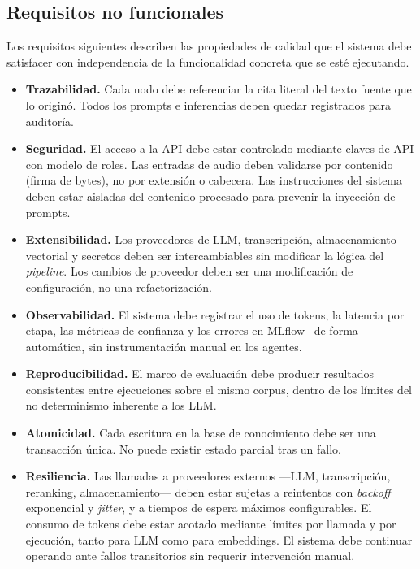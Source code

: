 \subsection{Requisitos no funcionales}

Los requisitos siguientes describen las propiedades de calidad que el sistema debe satisfacer con
independencia de la funcionalidad concreta que se esté ejecutando.

\begin{itemize}
  \item \textbf{Trazabilidad.} Cada nodo debe referenciar la cita literal del texto fuente que
        lo originó. Todos los prompts e inferencias deben quedar registrados para auditoría.

  \item \textbf{Seguridad.} El acceso a la \ac{API} debe estar controlado mediante claves de \ac{API} con
        modelo de roles. Las entradas de audio deben validarse por contenido (firma de bytes), no
        por extensión o cabecera. Las instrucciones del sistema deben estar aisladas del contenido
        procesado para prevenir la inyección de prompts.

  \item \textbf{Extensibilidad.} Los proveedores de LLM, transcripción, almacenamiento vectorial
        y secretos deben ser intercambiables sin modificar la lógica del \textit{pipeline}. Los
        cambios de proveedor deben ser una modificación de configuración, no una refactorización.

  \item \textbf{Observabilidad.} El sistema debe registrar el uso de tokens, la latencia por
        etapa, las métricas de confianza y los errores en MLflow~\cite{zaharia2018mlflow} de
        forma automática, sin instrumentación manual en los agentes.

  \item \textbf{Reproducibilidad.} El marco de evaluación debe producir resultados consistentes
        entre ejecuciones sobre el mismo corpus, dentro de los límites del no determinismo
        inherente a los \ac{LLM}.

  \item \textbf{Atomicidad.} Cada escritura en la base de conocimiento debe ser una transacción
        única. No puede existir estado parcial tras un fallo.

  \item \textbf{Resiliencia.} Las llamadas a proveedores externos —LLM, transcripción, reranking,
        almacenamiento— deben estar sujetas a reintentos con \textit{backoff} exponencial y
        \textit{jitter}, y a tiempos de espera máximos configurables. El consumo de tokens debe
        estar acotado mediante límites por llamada y por ejecución, tanto para LLM como para
        embeddings. El sistema debe continuar operando ante fallos transitorios sin requerir
        intervención manual.
\end{itemize}

